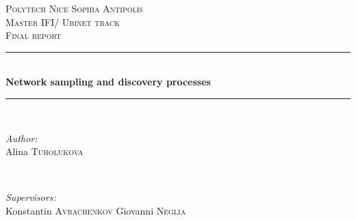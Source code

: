 \documentclass[12pt]{report}
\begin{document}
\begin{titlepage}

\newcommand{\HRule}{\rule{\linewidth}{0.5mm}} %

\center %

\textsc{\LARGE Polytech Nice Sophia Antipolis}\\[1.5cm] %
\textsc{\Large Master IFI/ Ubinet track}\\[0.5cm] %
\textsc{\large Final report}\\[0.5cm] %


\HRule \\[0.4cm]
{ \huge \bfseries Network sampling and discovery processes}\\[0.4cm] %
\HRule \\[1.5cm]
 

\begin{minipage}{0.4\textwidth}
\begin{flushleft} \large
\emph{Author:}\\
Alina \textsc{Tuholukova} %
\end{flushleft}
\end{minipage}
~
\begin{minipage}{0.5\textwidth}
\begin{flushright} \large
\emph{Supervisors:} \\
Konstantin \textsc{Avrachenkov} %
Giovanni \textsc{Neglia} %
\end{flushright}
\end{minipage}\\[9cm]



\end{titlepage}
\end{document}

